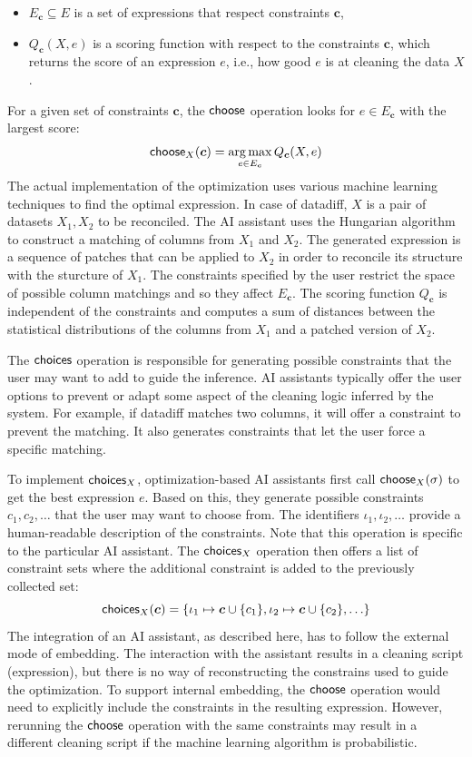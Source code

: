 \documentclass[a4paper,UKenglish,cleveref, autoref, thm-restate]{lipics-v2021}
\newcommand{\ident}[1]{\textsf{#1}}
\newcommand{\select}{\textnormal{\ident{choose}}}
\newcommand{\choices}{\textnormal{\ident{choices}}}
\DeclareMathOperator{\argmax}{arg\,max}
\begin{document}
\begin{itemize}
\item $E_{\boldsymbol{c}}\subseteq E$ is a set of expressions that respect constraints $\boldsymbol{c}$,
\item $Q_{\boldsymbol{c}}(X, e)$ is a scoring function with respect to the constraints $\boldsymbol{c}$,
  which returns the score of an expression $e$, i.e., how good $e$ is at cleaning the data $X$.
\end{itemize}

\noindent
For a given set of constraints $\boldsymbol{c}$, the $\select$ operation looks
for $e\in E_{\boldsymbol{c}}$ with the largest score:
\[
\select_X(\boldsymbol{c}) = \argmax_{e \in E_{\boldsymbol{c}}} Q_{\boldsymbol{c}}(X, e)
\]
The actual implementation of the optimization uses various machine learning techniques to
find the optimal expression. In case of datadiff, $X$ is a pair of datasets $X_1, X_2$ to be
reconciled. The AI assistant uses the Hungarian algorithm \cite{sutton-2018-datadiff} to construct
a matching of columns from $X_1$ and $X_2$. The generated expression is a sequence of patches
that can be applied to $X_2$ in order to reconcile its structure with the sturcture of $X_1$.
The constraints specified by the user restrict the space of possible column matchings and so they
affect $E_{\boldsymbol{c}}$. The scoring function $Q_{\boldsymbol{c}}$ is independent of
the constraints and computes a sum of distances between the statistical distributions of the
columns from $X_1$ and a patched version of $X_2$.

The $\choices$ operation is responsible for generating possible constraints that the user may
want to add to guide the inference. AI assistants typically offer the user options to prevent
or adapt some aspect of the cleaning logic inferred by the system. For example, if datadiff
matches two columns, it will offer a constraint to prevent the matching. It also generates
constraints that let the user force a specific matching.

To implement $\choices_X$, optimization-based AI assistants first call $\select_X(\sigma)$ to
get the best expression $e$. Based on this, they generate possible constraints $c_1, c_2, \ldots$
that the user may want to choose from. The identifiers $\iota_1,\iota_2, \ldots$ provide a
human-readable description of the constraints. Note that this operation is specific to the particular
AI assistant. The $\choices_X$ operation then offers a list of constraint sets where the additional
constraint is added to the previously collected set:
\[
\choices_X(\boldsymbol{c}) = \{\iota_1 \mapsto \boldsymbol{c}\cup\{ c_1 \}, \iota_2\mapsto\boldsymbol{c}\cup\{ c_2 \}, \ldots\}
\]
The integration of an AI assistant, as described here, has to follow the external mode of embedding.
The interaction with the assistant results in a cleaning script (expression), but there is no way
of reconstructing the constrains used to guide the optimization. To support internal embedding, the
$\select$ operation would need to explicitly include the constraints in the resulting expression.
However, rerunning the $\select$ operation with the same constraints may result in a different
cleaning script if the machine learning algorithm is probabilistic.
\end{document}

